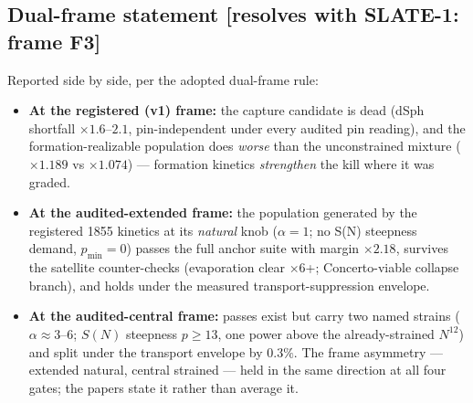 \subsection{Dual-frame statement [resolves with SLATE-1: frame F3]}
Reported side by side, per the adopted dual-frame rule:
\begin{itemize}
\item \textbf{At the registered (v1) frame:} the capture candidate is dead
(dSph shortfall $\times 1.6$--$2.1$, pin-independent under every audited pin
reading), and the formation-realizable population does \emph{worse} than the
unconstrained mixture ($\times 1.189$ vs $\times 1.074$) --- formation kinetics
\emph{strengthen} the kill where it was graded.
\item \textbf{At the audited-extended frame:} the population generated by the
registered 1855 kinetics at its \emph{natural} knob ($\alpha = 1$; no S(N)
steepness demand, $p_{\min} = 0$) passes the full anchor suite with margin
$\times 2.18$, survives the satellite counter-checks (evaporation clear
$\times 6$+; Concerto-viable collapse branch), and holds under the measured
transport-suppression envelope.
\item \textbf{At the audited-central frame:} passes exist but carry two named
strains ($\alpha \approx 3$--$6$; $S(N)$ steepness $p \geq 13$, one power above
the already-strained $N^{12}$) and split under the transport envelope by
$0.3\%$. The frame asymmetry --- extended natural, central strained --- held in
the same direction at all four gates; the papers state it rather than average it.
\end{itemize}

